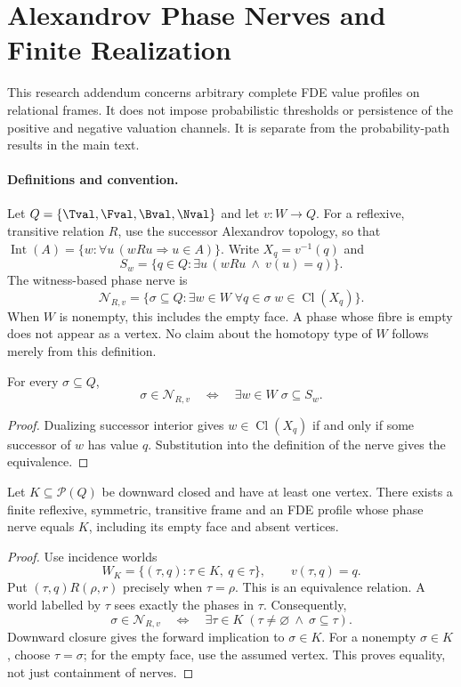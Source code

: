 \section{Alexandrov Phase Nerves and Finite Realization}
\label{app:phase-nerve}

This research addendum concerns arbitrary complete FDE value profiles on
relational frames. It does not impose probabilistic thresholds or persistence
of the positive and negative valuation channels. It is separate from the
probability-path results in the main text.

\paragraph{Definitions and convention.}
Let $Q=\{\Tval,\Fval,\Bval,\Nval\}$ and let $v:W\to Q$.
For a reflexive, transitive relation $R$, use the successor Alexandrov topology,
so that $\operatorname{Int}(A)=\{w: \forall u\,(wRu\Rightarrow u\in A)\}$.
Write $X_q=v^{-1}(q)$ and
\[
 S_w=\{q\in Q: \exists u\,(wRu\ \wedge\ v(u)=q)\}.
\]
The witness-based phase nerve is
\[
 \mathcal N_{R,v}
 =\{\sigma\subseteq Q: \exists w\in W\;
          \forall q\in\sigma\; w\in\operatorname{Cl}(X_q)\}.
\]
When $W$ is nonempty, this includes the empty face. A phase whose fibre is empty
does not appear as a vertex. No claim about the homotopy type of $W$ follows
merely from this definition.

\begin{theorem}
For every $\sigma\subseteq Q$,
\[
 \sigma\in\mathcal N_{R,v}
 \quad\Longleftrightarrow\quad
 \exists w\in W\;\sigma\subseteq S_w.
\]
\end{theorem}
\begin{proof}
Dualizing successor interior gives
$w\in\operatorname{Cl}(X_q)$ if and only if some successor of $w$ has value $q$.
Substitution into the definition of the nerve gives the equivalence.
\end{proof}

\begin{theorem}
Let $K\subseteq\mathcal P(Q)$ be downward closed and have at least one vertex.
There exists a finite reflexive, symmetric, transitive frame and an FDE profile
whose phase nerve equals $K$, including its empty face and absent vertices.
\end{theorem}
\begin{proof}
Use incidence worlds
\[
 W_K=\{(\tau,q):\tau\in K,\ q\in\tau\},\qquad
 v(\tau,q)=q.
\]
Put $(\tau,q)R(\rho,r)$ precisely when $\tau=\rho$.
This is an equivalence relation. A world labelled by $\tau$ sees exactly the
phases in $\tau$. Consequently,
\[
 \sigma\in\mathcal N_{R,v}
 \quad\Longleftrightarrow\quad
 \exists\tau\in K\;(\tau\ne\varnothing\ \wedge\ \sigma\subseteq\tau).
\]
Downward closure gives the forward implication to $\sigma\in K$.
For a nonempty $\sigma\in K$, choose $\tau=\sigma$; for the empty face, use
the assumed vertex. This proves equality, not just containment of nerves.
\end{proof}

